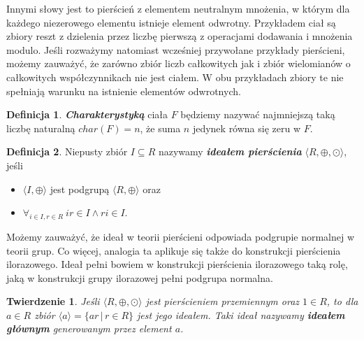 \documentclass[declaration,shortabstract]{iithesis}
\theoremstyle{definition}
\newtheorem{definition}{Definicja}
\theoremstyle{remark} \newtheorem{observation}{Obserwacja}
\theoremstyle{plain} \newtheorem{theorem}{Twierdzenie}
\theoremstyle{plain} \newtheorem{lemma}{Lemat}
\theoremstyle{remark} \newtheorem*{remark*}{Uwaga}
\theoremstyle{reminder} \newtheorem*{reminder*}{Przypomnienie}
\begin{document}
Innymi słowy jest to pierścień z elementem neutralnym mnożenia, w którym dla każdego niezerowego elementu istnieje element odwrotny. Przykładem ciał są zbiory reszt z dzielenia przez liczbę pierwszą z operacjami dodawania i mnożenia modulo. Jeśli rozważymy natomiast wcześniej przywołane przykłady pierścieni, możemy zauważyć, że zarówno zbiór liczb całkowitych jak i zbiór wielomianów o całkowitych współczynnikach nie jest ciałem. W obu przykładach zbiory te nie spełniają warunku na istnienie elementów odwrotnych.

\begin{definition}
	\textbf{\textit{Charakterystyką}} ciała $F$ będziemy nazywać najmniejszą taką liczbę naturalną $char(F) = n$, że suma $n$ jedynek równa się zeru w $F$.
\end{definition}

\theoremstyle{definition}
\begin{definition}
	Niepusty zbiór $I \subseteq R$ nazywamy \textbf{\textit{ideałem pierścienia}} $\langle R, \oplus, \odot \rangle$, jeśli
	\begin{itemize}[leftmargin=.5in]
		\item $\langle I, \oplus \rangle$ jest podgrupą $\langle R, \oplus \rangle$ oraz
		\item $\forall_{i \in I, r \in R} \: ir \in I \wedge ri \in I $.
	\end{itemize}
\end{definition}

Możemy zauważyć, że ideał w teorii pierścieni odpowiada podgrupie normalnej w teorii grup. Co więcej, analogia ta aplikuje się także do konstrukcji pierścienia ilorazowego. Ideał pełni bowiem w konstrukcji pierścienia ilorazowego taką rolę, jaką w konstrukcji grupy ilorazowej pełni podgrupa normalna.

\theoremstyle{theorem}
\begin{theorem}
	Jeśli $\langle R, \oplus, \odot \rangle$ jest pierścieniem przemiennym oraz $1 \in R$, to dla $a \in R$ zbiór $\langle a \rangle = \{ ar \, | \, r \in R  \}$ jest jego ideałem. Taki ideał nazywamy \textit{\textbf{ideałem głównym}} generowanym przez element $a$.
\end{theorem}
\end{document}
